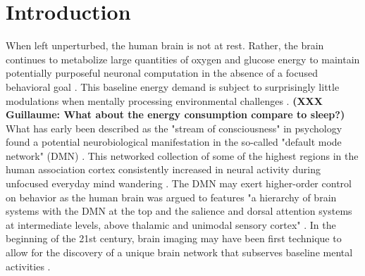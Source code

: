 \documentclass[10pt,letterpaper]{article}
\begin{document}
\section{Introduction}
%
When left unperturbed, the human brain is not at rest.
Rather, the brain continues to metabolize large quantities of
oxygen and glucose energy to maintain
potentially purposeful neuronal computation
in the absence of a focused behavioral goal
\citep{kenet2003spontaneously, fiser2004small}.
This baseline energy demand is subject to surprisingly little modulations
when mentally processing environmental challenges
\citep{raichle2001pnas}. \textbf{(XXX Guillaume: What about the energy consumption compare to sleep?)}
What has early been described as the "stream of consciousness"
in psychology \citep{james1890principles}
found a potential neurobiological manifestation
in the so-called "default mode network" (DMN)
\citep{shul1997}. This networked collection of some of the highest regions in
the human association cortex \citep{mesulam1998sensation, margulies2016situating}
consistently
increased in neural activity during
unfocused everyday mind wandering \citep{raichle2001pnas}.
The DMN may exert higher-order control on behavior
as the human brain was argued to features "a hierarchy of brain systems with
the DMN at the top and the salience and dorsal attention systems
at intermediate levels, above thalamic and unimodal sensory
cortex" \citep{carhart2010default}.
In the beginning of the 21st century,
brain imaging may have been first technique
to allow for the discovery of a unique brain network that subserves
baseline mental activities
\citep{raichle2001pnas, bzdok2015resting}.
\end{document}
